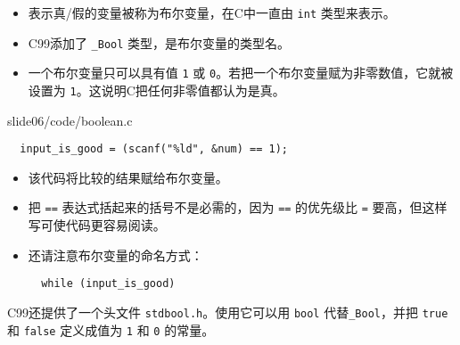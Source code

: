 \begin{frame}[fragile]
\begin{itemize}
\item 表示真/假的变量被称为布尔变量，在C中一直由 \lstinline|int| 类型来表示。\\[0.1in]
\item C99添加了 \lstinline|_Bool| 类型，是布尔变量的类型名。
\\[0.1in]
\item 一个布尔变量只可以具有值 \lstinline|1| 或 \lstinline|0|。若把一个布尔变量赋为非零数值，它就被设置为 \lstinline|1|。这说明C把任何非零值都认为是真。
\end{itemize}

\end{frame}


\begin{frame}[fragile]
  
  {slide06/code/boolean.c}

\end{frame}


\begin{frame}[fragile]
\begin{lstlisting}
  input_is_good = (scanf("%ld", &num) == 1);
\end{lstlisting}

\begin{itemize}
\item 该代码将比较的结果赋给布尔变量。\\[0.1in]
\item 把 \lstinline|==| 表达式括起来的括号不是必需的，因为 \lstinline|==| 的优先级比 \lstinline|=| 要高，但这样写可使代码更容易阅读。
\\[0.1in]
\item 还请注意布尔变量的命名方式：
\begin{lstlisting}
  while (input_is_good)
\end{lstlisting}
\end{itemize}

\end{frame}

\begin{frame}[fragile]
C99还提供了一个头文件 \lstinline|stdbool.h|。使用它可以用 \lstinline|bool| 代替\lstinline|_Bool|，并把 \lstinline|true| 和 \lstinline|false| 定义成值为 \lstinline|1| 和 \lstinline|0| 的常量。
\end{frame}

